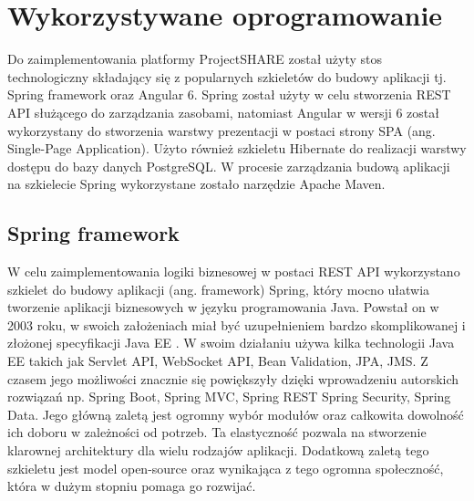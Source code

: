 \section{Wykorzystywane oprogramowanie}
\label{sec:wykorzystywaneOprogramowanie}
Do zaimplementowania platformy ProjectSHARE został użyty stos technologiczny składający się z popularnych szkieletów do budowy aplikacji tj. Spring framework oraz Angular 6. Spring został użyty w celu stworzenia REST API służącego do zarządzania zasobami, natomiast Angular w wersji 6 został wykorzystany do stworzenia warstwy prezentacji w postaci strony SPA (ang. Single-Page Application). Użyto również szkieletu Hibernate do realizacji warstwy dostępu do bazy danych PostgreSQL. W procesie zarządzania budową aplikacji na szkielecie Spring wykorzystane zostało narzędzie Apache Maven.

\subsection{Spring framework}
\label{subsec:springFramework}

W celu zaimplementowania logiki biznesowej w postaci REST API wykorzystano szkielet do budowy aplikacji (ang. framework) Spring, który mocno ułatwia tworzenie aplikacji biznesowych w języku programowania Java. Powstał on w 2003 roku, w swoich założeniach miał być uzupełnieniem bardzo skomplikowanej i złożonej specyfikacji Java EE \cite{SPR03}. W swoim działaniu używa kilka technologii Java EE takich jak Servlet API, WebSocket API, Bean Validation, JPA, JMS. Z czasem jego możliwości znacznie się powiększyły dzięki wprowadzeniu autorskich rozwiązań\cite{SPR02} np. Spring Boot, Spring MVC, Spring REST Spring Security, Spring Data. Jego główną zaletą jest ogromny wybór modułów oraz całkowita dowolność ich doboru w zależności od potrzeb. Ta elastyczność pozwala na stworzenie klarownej architektury dla wielu rodzajów aplikacji. Dodatkową zaletą tego szkieletu jest model open-source oraz wynikająca z tego ogromna społeczność, która w dużym stopniu pomaga go rozwijać. 

